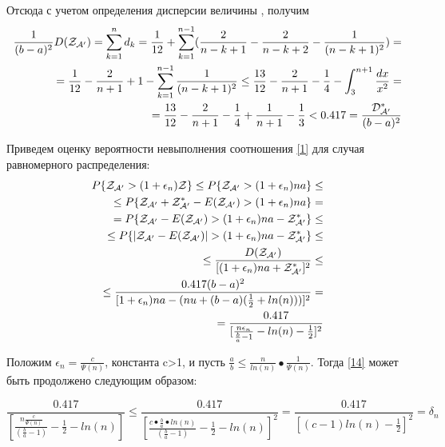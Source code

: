 \documentclass[a4paper, 14pt]{extarticle}
\begin{document}
Отсюда с учетом определения дисперсии величины \randomvalue , получим
\begin{equation}
\begin{aligned}
\frac{1}{(b-a)^2} \text{$D(\text{$\mathcal{Z_{A'}}$})$} = \sum_{k=1}^n d_k = \frac{1}{12} + \sum_{k=1}^{n-1} (\frac{2}{n-k+1} - \frac{2}{n-k+2} - \frac{1}{(n-k+1)^2}) = \\
= \frac{1}{12} - \frac{2}{n+1} +1 - \sum_{k=1}^{n-1} \frac{1}{(n-k+1)^2} \leq \frac{13}{12} - \frac{2}{n+1} - \frac{1}{4} - \int_3^{n+1} \frac{dx}{x^2} = \\
= \frac{13}{12} - \frac{2}{n+1} - \frac{1}{4} + \frac{1}{n+1} - \frac{1}{3} < 0.417 = \frac{\text{$\mathcal{D^*_{A'}}$}}{(b-a)^2} 
\end{aligned}
\end{equation}

Приведем оценку вероятности невыполнения соотношения \eqref{1} для случая равномерного распределения:
\begin{equation}\label{14}
\begin{aligned}
P\{ \text{$\mathcal{Z_{A'}}$} > (1+\epsilon_n) \mathcal{Z} \} \leq P\{ \text{$\mathcal{Z_{A'}}$} > (1+\epsilon_n)na \} \leq \\
\leq P\{ \text{$\mathcal{Z_{A'}}$} + \text{$\mathcal{Z^*_{A'}}$} - \text{$E(\text{$\mathcal{Z_{A'}}$})$} > (1+\epsilon_n)na \} = \\
= P \{ \text{$\mathcal{Z_{A'}}$} - \text{$E(\text{$\mathcal{Z_{A'}}$})$} > (1+\epsilon_n)na - \text{$\mathcal{Z^*_{A'}}$} \} \leq \\
\leq P \{ |\text{$\mathcal{Z_{A'}}$} - \text{$E(\text{$\mathcal{Z_{A'}}$})$}| > (1+\epsilon_n)na - \text{$\mathcal{Z^*_{A'}}$} \} \leq \\
\leq \frac{\text{$D(\text{$\mathcal{Z_{A'}}$})$}}{[(1+\epsilon_n)na + \text{$\mathcal{Z^*_{A'}}$}]^2} \leq \\
\leq \frac{0.417(b-a)^2}{[1+\epsilon_n)na-(nu+(b-a)(\frac{1}{2}+ln(n)))]^2} = \\
= \frac{0.417}{[\frac{n\epsilon_n}{\frac{b}{a}-1}-ln(n) -\frac{1}{2}]^2}
\end{aligned}
\end{equation}

Положим $\epsilon_n = \frac{c}{\Psi(n)}$, константа c>1, и пусть $\frac{a}{b} \leq \frac{n}{ln(n)} • \frac{1}{\Psi(n)}$. Тогда \eqref{14} может быть продолжено следующим образом:

\begin{equation}
\frac{0.417}{[\frac{n\frac{c}{\Psi(n)}}{(\frac{b}{a}-1)}-\frac{1}{2}-ln(n)]} \leq \frac{0.417}{[\frac{c•\frac{b}{a}•ln(n)}{(\frac{b}{a}-1)}-\frac{1}{2}-ln(n)]^2} = \frac{0.417}{[(c-1)ln(n)-\frac{1}{2}]^2} = \delta_n
\end{equation}
\end{document}
